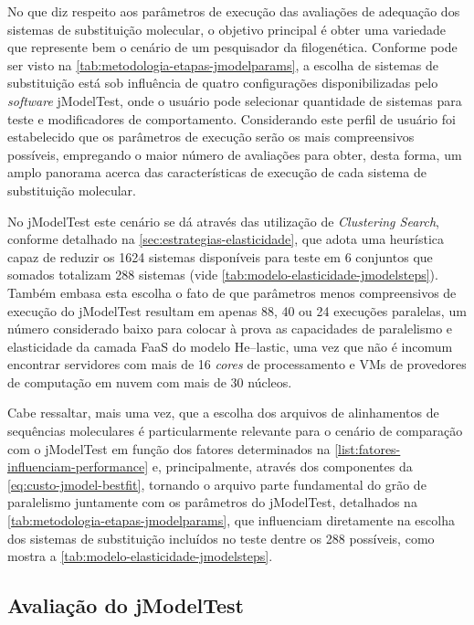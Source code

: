 \documentclass[english,brazilian]{UNISINOSmonografia} %
\begin{document}
No que diz respeito aos parâmetros de execução das avaliações de adequação dos sistemas de substituição molecular, o objetivo principal é obter uma variedade que represente bem o cenário de um pesquisador da filogenética.
Conforme pode ser visto na \autoref{tab:metodologia-etapas-jmodelparams}, a escolha de sistemas de substituição está sob influência de quatro configurações disponibilizadas pelo \textit{software} jModelTest, onde o usuário pode selecionar quantidade de sistemas para teste e modificadores de comportamento.
Considerando este perfil de usuário foi estabelecido que os parâmetros de execução serão os mais compreensivos possíveis, empregando o maior número de avaliações para obter, desta forma, um amplo panorama acerca das características de execução de cada sistema de substituição molecular.


No jModelTest este cenário se dá através das utilização de \textit{Clustering Search}, conforme detalhado na \autoref{sec:estrategias-elasticidade}, que adota uma heurística capaz de reduzir os 1624 sistemas disponíveis para teste em 6 conjuntos que somados totalizam 288 sistemas (vide \autoref{tab:modelo-elasticidade-jmodelsteps}).
Também embasa esta escolha o fato de que parâmetros menos compreensivos de execução do jModelTest resultam em apenas 88, 40 ou 24 execuções paralelas, um número considerado baixo para colocar à prova as capacidades de paralelismo e elasticidade da camada FaaS do modelo \textsf{He}--lastic, uma vez que não é incomum encontrar servidores com mais de 16 \textit{cores} de processamento e VMs de provedores de computação em nuvem com mais de 30 núcleos.


Cabe ressaltar, mais uma vez, que a escolha dos arquivos de alinhamentos de sequências moleculares é particularmente relevante para o cenário de comparação com o jModelTest em função dos fatores determinados na \autoref{list:fatores-influenciam-performance} e, principalmente, através dos componentes da \autoref{eq:custo-jmodel-bestfit}, tornando o arquivo parte fundamental do grão de paralelismo juntamente com os parâmetros do jModelTest, detalhados na \autoref{tab:metodologia-etapas-jmodelparams}, que influenciam diretamente na escolha dos sistemas de substituição incluídos no teste dentre os 288 possíveis, como mostra a \autoref{tab:modelo-elasticidade-jmodelsteps}.



\subsection{Avaliação do jModelTest}
\end{document}

